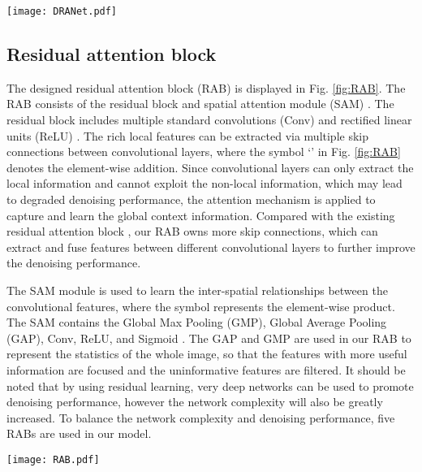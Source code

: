\documentclass[3p,times]{elsarticle}
\begin{document}
\begin{figure*}[htbp]
	\begin{center}
		\texttt{[image: DRANet.pdf]}
		\caption{The network architecture of the DRANet for image denoising.}
		\label{fig:DRANet}
	\end{center}
\end{figure*}

\subsection{Residual attention block}
The designed residual attention block (RAB) is displayed in Fig. \ref{fig:RAB}. The RAB consists of the residual block and spatial attention module (SAM) \cite{Woo2018}. The residual block includes multiple standard convolutions (Conv) and rectified linear units (ReLU) \cite{Krizhevsky2012}. The rich local features can be extracted via multiple skip connections between convolutional layers, where the symbol `' in Fig. \ref{fig:RAB} denotes the element-wise addition. Since convolutional layers can only extract the local information and cannot exploit the non-local information, which may lead to degraded denoising performance, the attention mechanism is applied to capture and learn the global context information. Compared with the existing residual attention block \cite{Hou2019, Zhang2019}, our RAB owns more skip connections, which can extract and fuse features between different convolutional layers to further improve the denoising performance.

The SAM module is used to learn the inter-spatial relationships between the convolutional features, where the symbol  represents the element-wise product. The SAM contains the Global Max Pooling (GMP), Global Average Pooling (GAP), Conv, ReLU, and Sigmoid \cite{Han1995}. The GAP and GMP are used in our RAB to represent the statistics of the whole image, so that the features with more useful information are focused and the uninformative features are filtered. It should be noted that by using residual learning, very deep networks can be used to promote denoising performance, however the network complexity will also be greatly increased. To balance the network complexity and denoising performance, five RABs are used in our model.

\begin{figure*}[htbp]
	\begin{center}
		\texttt{[image: RAB.pdf]}
		\caption{The architecture of the residual attention block (RAB).}
		\label{fig:RAB}
	\end{center}
\end{figure*}
\end{document}
